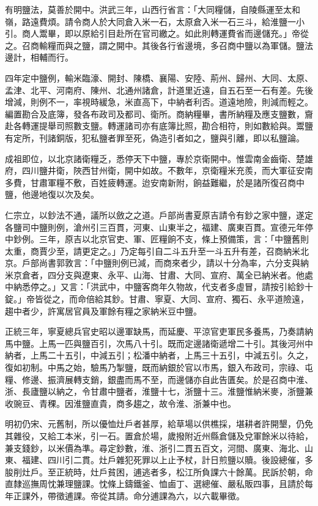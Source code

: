 有明鹽法，莫善於開中。洪武三年，山西行省言：「大同糧儲，自陵縣運至太和嶺，路遠費煩。請令商人於大同倉入米一石，太原倉入米一石三斗，給淮鹽一小引。商人鬻畢，即以原給引目赴所在官司繳之。如此則轉運費省而邊儲充。」帝從之。召商輸糧而與之鹽，謂之開中。其後各行省邊境，多召商中鹽以為軍儲。鹽法邊計，相輔而行。

四年定中鹽例，輸米臨濠、開封、陳橋、襄陽、安陸、荊州、歸州、大同、太原、孟津、北平、河南府、陳州、北通州諸倉，計道里近遠，自五石至一石有差。先後增減，則例不一，率視時緩急，米直高下，中納者利否。道遠地險，則減而輕之。編置勘合及底簿，發各布政司及都司、衛所。商納糧畢，書所納糧及應支鹽數，齎赴各轉運提舉司照數支鹽。轉運諸司亦有底簿比照，勘合相符，則如數給與。鬻鹽有定所，刊諸銅版，犯私鹽者罪至死，偽造引者如之，鹽與引離，即以私鹽論。

成祖即位，以北京諸衛糧乏，悉停天下中鹽，專於京衛開中。惟雲南金齒衛、楚雄府，四川鹽井衛，陜西甘州衛，開中如故。不數年，京衛糧米充羨，而大軍征安南多費，甘肅軍糧不敷，百姓疲轉運。迨安南新附，餉益難繼，於是諸所復召商中鹽，他邊地復以次及矣。

仁宗立，以鈔法不通，議所以斂之之道。戶部尚書夏原吉請令有鈔之家中鹽，遂定各鹽司中鹽則例，滄州引三百貫，河東、山東半之，福建、廣東百貫。宣德元年停中鈔例。三年，原吉以北京官吏、軍、匠糧餉不支，條上預備策，言：「中鹽舊則太重，商賈少至，請更定之。」乃定每引自二斗五升至一斗五升有差，召商納米北京。戶部尚書郭敦言：「中鹽則例已減，而商來者少，請以十分為率，六分支與納米京倉者，四分支與遼東、永平、山海、甘肅、大同、宣府、萬全已納米者。他處中納悉停之。」又言：「洪武中，中鹽客商年久物故，代支者多虛冒，請按引給鈔十錠。」帝皆從之，而命倍給其鈔。甘肅、寧夏、大同、宣府、獨石、永平道險遠，趨中者少，許寓居官員及軍餘有糧之家納米豆中鹽。

正統三年，寧夏總兵官史昭以邊軍缺馬，而延慶、平涼官吏軍民多養馬，乃奏請納馬中鹽。上馬一匹與鹽百引，次馬八十引。既而定邊諸衛遞增二十引。其後河州中納者，上馬二十五引，中減五引；松潘中納者，上馬三十五引，中減五引。久之，復如初制。中馬之始，驗馬乃掣鹽，既而納銀於官以市馬，銀入布政司，宗祿、屯糧、修邊、振濟展轉支銷，銀盡而馬不至，而邊儲亦自此告匱矣。於是召商中淮、浙、長廬鹽以納之，令甘肅中鹽者，淮鹽十七，浙鹽十三。淮鹽惟納米麥，浙鹽兼收豌豆、青稞。因淮鹽直貴，商多趨之，故令淮、浙兼中也。

明初仍宋、元舊制，所以優恤灶戶者甚厚，給草場以供樵採，堪耕者許開墾，仍免其雜役，又給工本米，引一石。置倉於場，歲撥附近州縣倉儲及兌軍餘米以待給，兼支錢鈔，以米價為準。尋定鈔數，淮、浙引二貫五百文，河間、廣東、海北、山東、福建、四川引二貫。灶戶雜犯死罪以上止予杖，計日煎鹽以贖。後設總催，多朘削灶戶。至正統時，灶戶貧困，逋逃者多，松江所負課六十餘萬。民訴於朝，命直隸巡撫周忱兼理鹽課。忱條上鑄鐵釜、恤鹵丁、選總催、嚴私販四事，且請於每年正課外，帶徵逋課。帝從其請。命分逋課為六，以六載畢徵。

